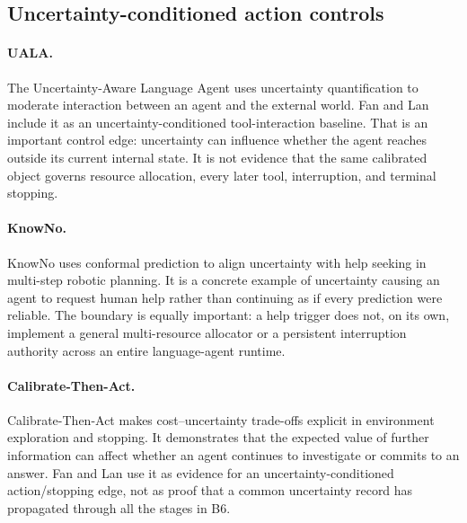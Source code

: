 \subsection{Uncertainty-conditioned action controls}
\label{sec:ch16-uncertainty-baselines}

\paragraph{UALA.} The Uncertainty-Aware Language Agent uses uncertainty quantification to moderate interaction between an agent and the external world. Fan and Lan include it as an uncertainty-conditioned tool-interaction baseline. That is an important control edge: uncertainty can influence whether the agent reaches outside its current internal state. It is not evidence that the same calibrated object governs resource allocation, every later tool, interruption, and terminal stopping.\autocite{han2024uala}

\paragraph{KnowNo.} KnowNo uses conformal prediction to align uncertainty with help seeking in multi-step robotic planning. It is a concrete example of uncertainty causing an agent to request human help rather than continuing as if every prediction were reliable. The boundary is equally important: a help trigger does not, on its own, implement a general multi-resource allocator or a persistent interruption authority across an entire language-agent runtime.\autocite{ren2023knowno}

\paragraph{Calibrate-Then-Act.} Calibrate-Then-Act makes cost--uncertainty trade-offs explicit in environment exploration and stopping. It demonstrates that the expected value of further information can affect whether an agent continues to investigate or commits to an answer. Fan and Lan use it as evidence for an uncertainty-conditioned action/stopping edge, not as proof that a common uncertainty record has propagated through all the stages in B6.\autocite{ding2026calibratethenact}

